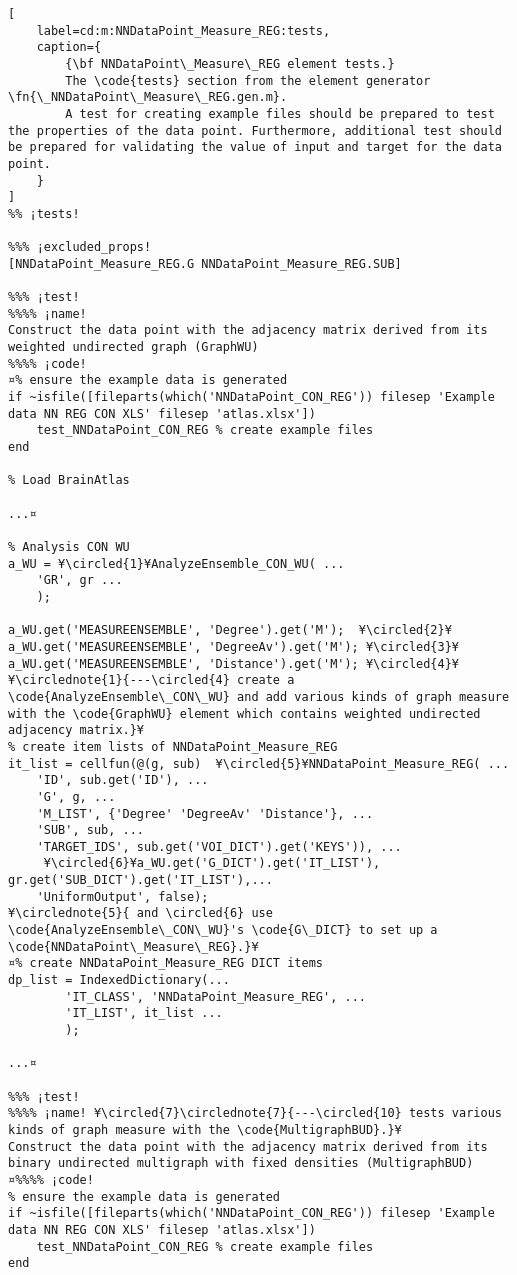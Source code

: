 \documentclass{tufte-handout}
\begin{document}
\begin{lstlisting}[
	label=cd:m:NNDataPoint_Measure_REG:tests,
	caption={
		{\bf NNDataPoint\_Measure\_REG element tests.}
		The \code{tests} section from the element generator \fn{\_NNDataPoint\_Measure\_REG.gen.m}.
		A test for creating example files should be prepared to test the properties of the data point. Furthermore, additional test should be prepared for validating the value of input and target for the data point.
	}
]		
%% ¡tests!

%%% ¡excluded_props!
[NNDataPoint_Measure_REG.G NNDataPoint_Measure_REG.SUB]

%%% ¡test!
%%%% ¡name! 
Construct the data point with the adjacency matrix derived from its weighted undirected graph (GraphWU) 
%%%% ¡code!
¤% ensure the example data is generated
if ~isfile([fileparts(which('NNDataPoint_CON_REG')) filesep 'Example data NN REG CON XLS' filesep 'atlas.xlsx'])
    test_NNDataPoint_CON_REG % create example files
end

% Load BrainAtlas

...¤

% Analysis CON WU
a_WU = ¥\circled{1}¥AnalyzeEnsemble_CON_WU( ...
    'GR', gr ...
    );

a_WU.get('MEASUREENSEMBLE', 'Degree').get('M');  ¥\circled{2}¥
a_WU.get('MEASUREENSEMBLE', 'DegreeAv').get('M'); ¥\circled{3}¥
a_WU.get('MEASUREENSEMBLE', 'Distance').get('M'); ¥\circled{4}¥
¥\circlednote{1}{---\circled{4} create a \code{AnalyzeEnsemble\_CON\_WU} and add various kinds of graph measure with the \code{GraphWU} element which contains weighted undirected adjacency matrix.}¥
% create item lists of NNDataPoint_Measure_REG
it_list = cellfun(@(g, sub)  ¥\circled{5}¥NNDataPoint_Measure_REG( ...
    'ID', sub.get('ID'), ...
    'G', g, ...
    'M_LIST', {'Degree' 'DegreeAv' 'Distance'}, ...
    'SUB', sub, ...
    'TARGET_IDS', sub.get('VOI_DICT').get('KEYS')), ...
     ¥\circled{6}¥a_WU.get('G_DICT').get('IT_LIST'), gr.get('SUB_DICT').get('IT_LIST'),...
    'UniformOutput', false);
¥\circlednote{5}{ and \circled{6} use \code{AnalyzeEnsemble\_CON\_WU}'s \code{G\_DICT} to set up a \code{NNDataPoint\_Measure\_REG}.}¥
¤% create NNDataPoint_Measure_REG DICT items
dp_list = IndexedDictionary(...
        'IT_CLASS', 'NNDataPoint_Measure_REG', ...
        'IT_LIST', it_list ...
        );

...¤

%%% ¡test!
%%%% ¡name! ¥\circled{7}\circlednote{7}{---\circled{10} tests various kinds of graph measure with the \code{MultigraphBUD}.}¥
Construct the data point with the adjacency matrix derived from its binary undirected multigraph with fixed densities (MultigraphBUD)
¤%%%% ¡code!
% ensure the example data is generated
if ~isfile([fileparts(which('NNDataPoint_CON_REG')) filesep 'Example data NN REG CON XLS' filesep 'atlas.xlsx'])
    test_NNDataPoint_CON_REG % create example files
end


\end{lstlisting}
\end{document}
